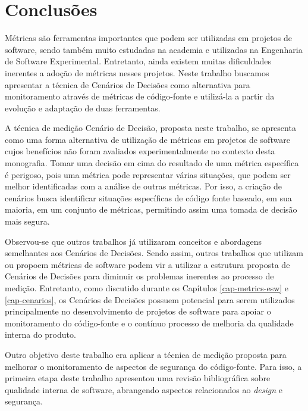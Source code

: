 \chapter{Conclusões}
\label{cap-consideracoesFinais}

Métricas são ferramentas importantes que podem ser utilizadas em projetos de software, sendo também muito estudadas na academia e utilizadas na Engenharia de Software Experimental. Entretanto, ainda existem muitas dificuldades inerentes a adoção de métricas nesses projetos. Neste trabalho buscamos apresentar a técnica de Cenários de Decisões como alternativa para monitoramento através de métricas de código-fonte e utilizá-la a partir da evolução e adaptação de duas ferramentas.

%

A técnica de medição Cenário de Decisão, proposta neste trabalho, se apresenta como uma forma alternativa de utilização de métricas em projetos de software cujos benefícios não foram avaliados experimentalmente no contexto desta monografia.  Tomar uma decisão em cima do resultado de uma métrica específica é perigoso, pois uma métrica pode representar várias situações, que podem ser melhor identificadas com a análise de outras métricas. Por isso, a criação de cenários busca identificar situações específicas de código fonte baseado, em sua maioria, em um conjunto de métricas, permitindo assim uma tomada de decisão mais segura. 

%

Observou-se que outros trabalhos já utilizaram conceitos e abordagens semelhantes aos Cenários de Decisões. Sendo assim, outros trabalhos que utilizam ou propoem  métricas de software podem vir a utilizar a estrutura proposta de Cenários de Decisões para diminuir os problemas inerentes ao processo de medição. Entretanto, como discutido durante os Capítulos \ref{cap-metrics-esw} e \ref{cap-cenarios}, os   Cenários de Decisões possuem potencial para serem utilizados principalmente no desenvolvimento de projetos de software para apoiar o monitoramento do código-fonte e o contínuo processo de melhoria da qualidade interna do produto. 

%

Outro objetivo deste trabalho era aplicar a técnica de medição proposta para melhorar o monitoramento de aspectos de segurança do código-fonte. Para isso, a primeira etapa deste trabalho apresentou uma revisão bibliográfica sobre qualidade interna de software, abrangendo aspectos relacionados ao \emph{design} e segurança. 

